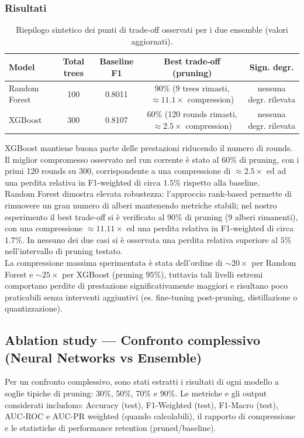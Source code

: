\documentclass[a4paper,12pt]{report}
\begin{document}
	\subsubsection{Risultati}
	\begin{table}[H]
		\centering
		\setlength{\tabcolsep}{4pt}
		\begin{tabular}{lcccc}
			\toprule
			\textbf{Model} & \textbf{Total trees} & \textbf{Baseline F1} & \textbf{Best trade-off (pruning)} & \textbf{Sign. degr.} \\
			\midrule
			Random Forest & 100 & 0.8011 & 90\% (9 trees rimasti, $\approx 11.1\times$ compression) & nessuna degr. rilevata \\
			XGBoost       & 300 & 0.8107 & 60\% (120 rounds rimasti, $\approx 2.5\times$ compression) & nessuna degr. rilevata \\
			\bottomrule
		\end{tabular}
		\caption{Riepilogo sintetico dei punti di trade-off osservati per i due ensemble (valori aggiornati).}
	\end{table}
	
	XGBoost mantiene buona parte delle prestazioni riducendo il numero di rounds. Il miglior compromesso osservato nel run corrente è stato al $60\%$ di pruning, con i primi 120 rounds su 300, corrispondente a una compressione di $\approx 2.5\times$ ed ad una perdita relativa in F1-weighted di circa $1.5\%$ rispetto alla baseline. \\
	Random Forest dimostra elevata robustezza: l'approccio rank-based permette di rimuovere un gran numero di alberi mantenendo metriche stabili; nel nostro esperimento il best trade-off si è verificato al $90\%$ di pruning (9 alberi rimanenti), con una compressione $\approx 11.11\times$ ed una perdita relativa in F1-weighted di circa $1.7\%$. In nessuno dei due casi si è osservata una perdita relativa superiore al $5\%$ nell'intervallo di pruning testato. \\
	La compressione massima sperimentata è stata dell'ordine di $\sim 20\times$ per Random Forest e $\sim 25\times$ per XGBoost (pruning $95\%$), tuttavia tali livelli estremi comportano perdite di prestazione significativamente maggiori e risultano poco praticabili senza interventi aggiuntivi (es. fine-tuning post-pruning, distillazione o quantizzazione).
	
	\subsection{Ablation study — Confronto complessivo (Neural Networks vs Ensemble)}
	Per un confronto complessivo, sono stati estratti i risultati di ogni modello a soglie tipiche di pruning: 30\%, 50\%, 70\% e 90\%. Le metriche e gli output considerati includono: Accuracy (test), F1-Weighted (test), F1-Macro (test), AUC-ROC e AUC-PR weighted (quando calcolabili), il rapporto di compressione e le statistiche di performance retention (pruned/baseline).
	
\end{document}

